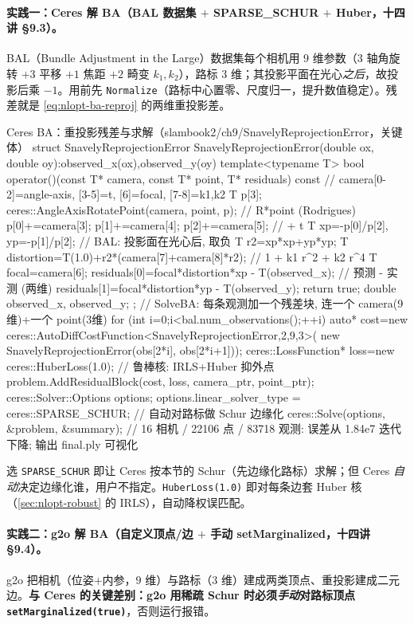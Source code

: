 \paragraph{实践一：Ceres 解 BA（BAL 数据集 $+$ SPARSE\_SCHUR $+$ Huber，十四讲 §9.3）。}\cite{gaoxiang2019slam14}
BAL（Bundle Adjustment in the Large）数据集每个相机用 $9$ 维参数（$3$ 轴角旋转 $+3$ 平移 $+1$ 焦距 $+2$ 畸变 $k_1,k_2$），路标 $3$ 维；其投影平面在光心\emph{之后}，故投影后乘 $-1$。用前先 \texttt{Normalize}（路标中心置零、尺度归一，提升数值稳定）。残差就是 \cref{eq:nlopt-ba-reproj} 的两维重投影差。

\begin{codebox}[C++]{Ceres BA：重投影残差与求解（slambook2/ch9/SnavelyReprojectionError，关键体）}
struct SnavelyReprojectionError {
  SnavelyReprojectionError(double ox, double oy):observed_x(ox),observed_y(oy){}
  template<typename T>
  bool operator()(const T* camera, const T* point, T* residuals) const {
    // camera[0-2]=angle-axis, [3-5]=t, [6]=focal, [7-8]=k1,k2
    T p[3];
    ceres::AngleAxisRotatePoint(camera, point, p);      // R*point  (Rodrigues)
    p[0]+=camera[3]; p[1]+=camera[4]; p[2]+=camera[5];  // + t
    T xp=-p[0]/p[2], yp=-p[1]/p[2];                     // BAL: 投影面在光心后, 取负
    T r2=xp*xp+yp*yp;
    T distortion=T(1.0)+r2*(camera[7]+camera[8]*r2);    // 1 + k1 r^2 + k2 r^4
    T focal=camera[6];
    residuals[0]=focal*distortion*xp - T(observed_x);   // 预测 - 实测 (两维)
    residuals[1]=focal*distortion*yp - T(observed_y);
    return true;
  }
  double observed_x, observed_y;
};
// SolveBA: 每条观测加一个残差块, 连一个 camera(9维)+一个 point(3维)
for (int i=0;i<bal.num_observations();++i){
  auto* cost=new ceres::AutoDiffCostFunction<SnavelyReprojectionError,2,9,3>(
               new SnavelyReprojectionError(obs[2*i], obs[2*i+1]));
  ceres::LossFunction* loss=new ceres::HuberLoss(1.0); // 鲁棒核: IRLS+Huber 抑外点
  problem.AddResidualBlock(cost, loss, camera_ptr, point_ptr);
}
ceres::Solver::Options options;
options.linear_solver_type = ceres::SPARSE_SCHUR;  // 自动对路标做 Schur 边缘化
ceres::Solve(options, &problem, &summary);
// 16 相机 / 22106 点 / 83718 观测: 误差从 1.84e7 迭代下降; 输出 final.ply 可视化
\end{codebox}

\noindent 选 \texttt{SPARSE\_SCHUR} 即让 Ceres 按本节的 Schur（先边缘化路标）求解；但 Ceres \emph{自动}决定边缘化谁，用户不指定。\texttt{HuberLoss(1.0)} 即对每条边套 Huber 核（\cref{sec:nlopt-robust} 的 IRLS），自动降权误匹配。

\paragraph{实践二：g2o 解 BA（自定义顶点/边 $+$ 手动 setMarginalized，十四讲 §9.4）。}\cite{gaoxiang2019slam14}
g2o 把相机（位姿$+$内参，$9$ 维）与路标（$3$ 维）建成两类顶点、重投影建成二元边。\textbf{与 Ceres 的关键差别：g2o 用稀疏 Schur 时必须\emph{手动}对路标顶点 \texttt{setMarginalized(true)}}，否则运行报错。

